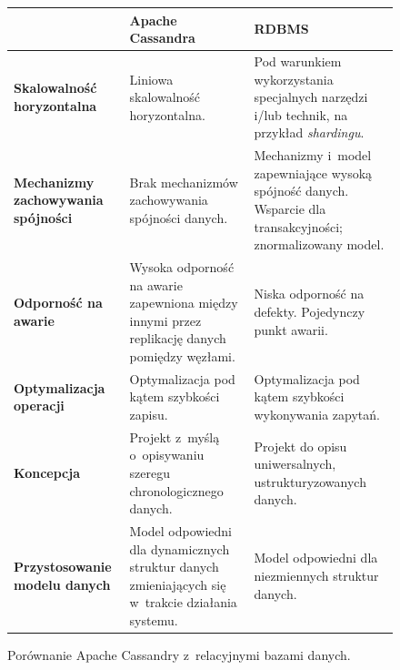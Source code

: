 \begin{figure}[ht!]
	\begin{minipage}{\textwidth}
		\setcounter{mpfootnote}{6}
		\centering

		\begin{tabular}{|p{3cm}|p{4.5cm}|p{4.5cm}|}
			\hline
			& {\small \textbf{Apache Cassandra}} & {\small \textbf{RDBMS}} \\
			\hline
			{\small \textbf{Skalowalność horyzontalna}} &
			Liniowa skalowalność horyzontalna. &
			Pod warunkiem wykorzystania specjalnych narzędzi i/lub technik, na przykład \emph{shardingu}\footnotemark{}. \\
			\hline
			{\small \textbf{Mechanizmy zachowywania spójności}} &
			Brak mechanizmów zachowywania spójności danych. &
			Mechanizmy i~model zapewniające wysoką spójność danych. Wsparcie dla transakcyjności; znormalizowany model. \\
			\hline
			{\small \textbf{Odporność na awarie}} &
			Wysoka odporność na awarie zapewniona między innymi przez replikację danych pomiędzy węzłami. &
			Niska odporność na defekty. Pojedynczy punkt awarii. \\
			\hline
			{\small \textbf{Optymalizacja operacji}} &
			Optymalizacja pod kątem szybkości zapisu. &
			Optymalizacja pod kątem szybkości wykonywania zapytań. \\
			\hline
			{\small \textbf{Koncepcja}} &
			Projekt z~myślą o~opisywaniu szeregu chronologicznego danych.~\cite{why_should_i_use_cassandra} &
			Projekt do opisu uniwersalnych, ustrukturyzowanych danych. \\
			\hline
			{\small \textbf{Przystosowanie modelu danych}} &
			Model odpowiedni dla dynamicznych struktur danych zmieniających się w~trakcie działania systemu.~\cite{consider_cassandra} &
			Model odpowiedni dla niezmiennych struktur danych. \\
			\hline
		\end{tabular}


		\caption{Porównanie Apache Cassandry z~relacyjnymi bazami danych.}
		\label{tab:cassanda_relationship_database_comparison}
	\end{minipage}
\end{figure}

